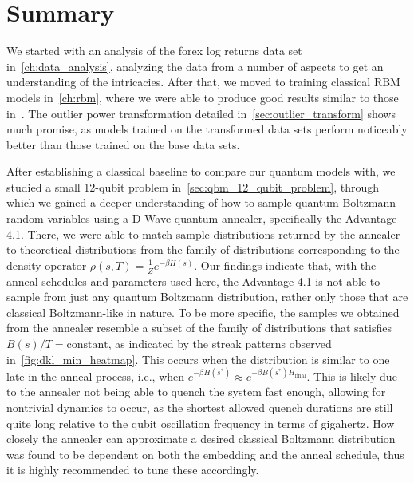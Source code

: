 \section{Summary}
We started with an analysis of the forex log returns data set in~\cref{ch:data_analysis}, analyzing the data from a number of aspects to get an understanding of the intricacies.
After that, we moved to training classical RBM models in~\cref{ch:rbm}, where we were able to produce good results similar to those in~\cite{kondratyev_2019}.
The outlier power transformation detailed in~\cref{sec:outlier_transform} shows much promise, as models trained on the transformed data sets perform noticeably better than those trained on the base data sets.

After establishing a classical baseline to compare our quantum models with, we studied a small 12-qubit problem in~\cref{sec:qbm_12_qubit_problem}, through which we gained a deeper understanding of how to sample quantum Boltzmann random variables using a D-Wave quantum annealer, specifically the Advantage 4.1.
There, we were able to match sample distributions returned by the annealer to theoretical distributions from the family of distributions corresponding to the density operator \( \rho(s,T) = \frac{1}{Z}e^{-\beta H(s)} \).
Our findings indicate that, with the anneal schedules and parameters used here, the Advantage 4.1 is not able to sample from just any quantum Boltzmann distribution, rather only those that are classical Boltzmann-like in nature.
To be more specific, the samples we obtained from the annealer resemble a subset of the family of distributions that satisfies \( B(s) / T = \text{constant} \), as indicated by the streak patterns observed in~\cref{fig:dkl_min_heatmap}.
This occurs when the distribution is similar to one late in the anneal process, i.e., when \( e^{-\beta H(s^*)} \approx e^{-\beta B(s^*) H_\text{final}} \).
This is likely due to the annealer not being able to quench the system fast enough, allowing for nontrivial dynamics to occur, as the shortest allowed quench durations are still quite long relative to the qubit oscillation frequency in terms of gigahertz.
How closely the annealer can approximate a desired classical Boltzmann distribution was found to be dependent on both the embedding and the anneal schedule, thus it is highly recommended to tune these accordingly.

